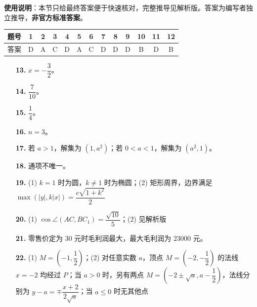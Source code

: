 
\begin{gknotice}
\textbf{使用说明}：本节只给最终答案便于快速核对，完整推导见解析版。答案为编写者独立推导，\textbf{非官方标准答案}。
\end{gknotice}

\begin{center}\begin{tabular}{ccccccccccccc}
\toprule
题号 & 1 & 2 & 3 & 4 & 5 & 6 & 7 & 8 & 9 & 10 & 11 & 12 \\
\midrule
答案 & D & A & C & D & A & C & D & D & D & B & D & B \\
\bottomrule
\end{tabular}\end{center}

\begin{itemize}[leftmargin=2.6em]
  \item[\textbf{13.}] $x=-\dfrac32$。
  \item[\textbf{14.}] $\dfrac7{10}$。
  \item[\textbf{15.}] $\dfrac14$。
  \item[\textbf{16.}] $n=3$。
\end{itemize}

\begin{itemize}[leftmargin=2.6em]
  \item[\textbf{17.}] 若 $a>1$，解集为 $(1,a^2)$；若 $0<a<1$，解集为 $(a^2,1)$。
  \item[\textbf{18.}] 通项不唯一。
  \item[\textbf{19.}] (1) $k=1$ 时为圆，$k\ne1$ 时为椭圆；(2) 矩形周界，边界满足 $\max(|y|,k|x|)=\dfrac{c\sqrt{1+k^2}}2$
  \item[\textbf{20.}] (1) $\cos\angle(AC,BC_1)=\dfrac{\sqrt{10}}5$；(2) 见解析版
  \item[\textbf{21.}] 零售价定为 $30$ 元时毛利润最大，最大毛利润为 $23000$ 元。
  \item[\textbf{22.}] (1) $M=(-1,\dfrac12)$；(2) 对任意实数 $a$，顶点 $M=(-2,-\dfrac12)$ 的法线 $x=-2$ 均经过 $P$；当 $a>0$ 时，另有两点 $M=(-2\pm\sqrt a,a-\dfrac12)$，法线分别为 $y-a=\mp\dfrac{x+2}{2\sqrt a}$；当 $a\le0$ 时无其他点
\end{itemize}

